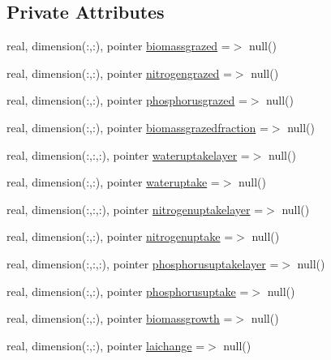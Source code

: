 \subsection*{Private Attributes}
\begin{DoxyCompactItemize}
\item 
real, dimension(\+:,\+:), pointer \mbox{\hyperlink{structmodulevegetation_1_1t__fluxes_ace4f34c23784544f15af247435c0b229}{biomassgrazed}} =$>$ null()
\item 
real, dimension(\+:,\+:), pointer \mbox{\hyperlink{structmodulevegetation_1_1t__fluxes_ad653bf048e204329c833132a27cbf1e8}{nitrogengrazed}} =$>$ null()
\item 
real, dimension(\+:,\+:), pointer \mbox{\hyperlink{structmodulevegetation_1_1t__fluxes_a16e77ea5dd4355eaf7e002891f974b64}{phosphorusgrazed}} =$>$ null()
\item 
real, dimension(\+:,\+:), pointer \mbox{\hyperlink{structmodulevegetation_1_1t__fluxes_adcad97038a96ae00e7b9471a60f27e2a}{biomassgrazedfraction}} =$>$ null()
\item 
real, dimension(\+:,\+:,\+:), pointer \mbox{\hyperlink{structmodulevegetation_1_1t__fluxes_a51a2312d2a3f914ca3a6f152e7f43d29}{wateruptakelayer}} =$>$ null()
\item 
real, dimension(\+:,\+:), pointer \mbox{\hyperlink{structmodulevegetation_1_1t__fluxes_acca5f1277259cd9c92ebc60c695dd4b2}{wateruptake}} =$>$ null()
\item 
real, dimension(\+:,\+:,\+:), pointer \mbox{\hyperlink{structmodulevegetation_1_1t__fluxes_a689a8c9f2100e708031f2ec2ae35e775}{nitrogenuptakelayer}} =$>$ null()
\item 
real, dimension(\+:,\+:), pointer \mbox{\hyperlink{structmodulevegetation_1_1t__fluxes_a97e7113f05619e7f4f720672ee36dc6e}{nitrogenuptake}} =$>$ null()
\item 
real, dimension(\+:,\+:,\+:), pointer \mbox{\hyperlink{structmodulevegetation_1_1t__fluxes_aa069f0e72a4fb5f3ddb035b48cb49b6f}{phosphorusuptakelayer}} =$>$ null()
\item 
real, dimension(\+:,\+:), pointer \mbox{\hyperlink{structmodulevegetation_1_1t__fluxes_aae865b5adee14affdd497f9ea2590ba3}{phosphorusuptake}} =$>$ null()
\item 
real, dimension(\+:,\+:), pointer \mbox{\hyperlink{structmodulevegetation_1_1t__fluxes_aab0c1ef9afd77d4e9f923fe96a37e375}{biomassgrowth}} =$>$ null()
\item 
real, dimension(\+:,\+:), pointer \mbox{\hyperlink{structmodulevegetation_1_1t__fluxes_af426d36e0b1b93658850c490b0c0cf7a}{laichange}} =$>$ null()

\end{DoxyCompactItemize}
